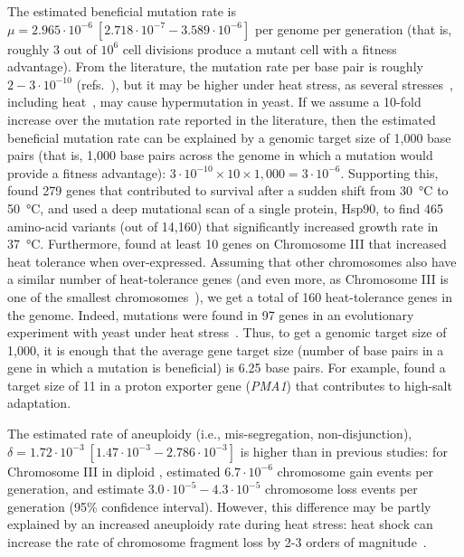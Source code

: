 \documentclass[12pt]{extarticle}
\begin{document}
The estimated beneficial mutation rate is $\mu=2.965\cdot10^{-6}\ [2.718\cdot10^{-7}-3.589\cdot10^{-6}]$ per genome per generation (that is, roughly 3 out of $10^6$ cell divisions produce a mutant cell with a fitness advantage).
From the literature, the mutation rate per base pair is roughly $2-3\cdot10^{-10}$ (refs.~\citep{Zhu2014,Lynch2008}), but it may be higher under heat stress, as several stresses~\citep{Heidenreich2007}, including heat~\citep{Huang2018}, may cause hypermutation in yeast.
If we assume a 10-fold increase over the mutation rate reported in the literature, then the estimated beneficial mutation rate can be explained by a genomic target size of 1,000 base pairs (that is, 1,000 base pairs across the genome in which a mutation would provide a fitness advantage): $3\cdot10^{-10} \times 10 \times 1,000=3\cdot10^{-6}$.
Supporting this, \citet{Jarolim2013} found 279 genes that contributed to survival after a sudden shift from \SI{30}{\celsius} to \SI{50}{\celsius}, and \citet{Flynn2020} used a deep mutational scan of a single protein, Hsp90, to find 465 amino-acid variants (out of 14,160) that significantly increased growth rate in \SI{37}{\celsius}.
Furthermore, \citet{Yona2012} found at least 10 genes on Chromosome III that increased heat tolerance when over-expressed.
Assuming that other chromosomes also have a similar number of heat-tolerance genes (and even more, as Chromosome III is one of the smallest chromosomes~\citep{Gilchrist2019}), we get a total of 160 heat-tolerance genes in the genome.
Indeed, mutations were found in 97 genes in an evolutionary experiment with yeast under heat stress~\citep{Huang2018}.
Thus, to get a genomic target size of 1,000, it is enough that the average gene target size (number of base pairs in a gene in which a mutation is beneficial) is 6.25 base pairs. For example, \citet{Kohn2014} found a target size of 11 in a proton exporter gene (\emph{PMA1}) that contributes to high-salt adaptation.

The estimated rate of aneuploidy (i.e., mis-segregation, non-disjunction), $\delta=1.72\cdot10^{-3}\ [1.47\cdot10^{-3}-2.786\cdot10^{-3}]$ is higher than in previous studies: for Chromosome III in diploid \yeast, \citet{Zhu2014} estimated $6.7\cdot10^{-6}$ chromosome gain events per generation, and \citet{Kumaran2013} estimate $3.0\cdot10^{-5}-4.3\cdot10^{-5}$ chromosome loss events per generation (95\% confidence interval). 
However, this difference may be partly explained by an increased aneuploidy rate during heat stress: heat shock can increase the rate of chromosome fragment loss by 2-3 orders of magnitude~\citep{Chen2012a}.
\end{document}

